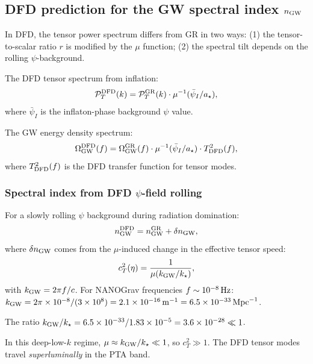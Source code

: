\documentclass[11pt]{article}
\newcommand{\ee}[1]{\times 10^{#1}}
\newcommand{\mufd}{\mu}
\newcommand{\DFD}{{\rm DFD}}
\begin{document}
\subsection{DFD prediction for the GW spectral index $n_{\rm GW}$}

In DFD, the tensor power spectrum differs from GR in two ways:
(1) the tensor-to-scalar ratio $r$ is modified by the $\mufd$ function;
(2) the spectral tilt depends on the rolling $\psi$-background.

The DFD tensor spectrum from inflation:
\begin{equation}\label{eq:tensor-spectrum}
  \mathcal{P}_T^\DFD(k) = \mathcal{P}_T^{\rm GR}(k)\cdot
  \mufd^{-1}(\bar\psi_I/a_\star),
\end{equation}
where $\bar\psi_I$ is the inflaton-phase background $\psi$ value.

The GW energy density spectrum:
\begin{equation}
  \Omega_{\rm GW}^\DFD(f) = \Omega_{\rm GW}^{\rm GR}(f)\cdot
  \mufd^{-1}(\bar\psi_I/a_\star)\cdot
  T_\DFD^2(f),
\end{equation}
where $T_\DFD^2(f)$ is the DFD transfer function for tensor modes.

\subsubsection{Spectral index from DFD $\psi$-field rolling}

For a slowly rolling $\psi$ background during radiation domination:
\begin{equation}
  n_{\rm GW}^\DFD = n_{\rm GW}^{\rm GR} + \delta n_{\rm GW},
\end{equation}
where $\delta n_{\rm GW}$ comes from the $\mufd$-induced change in
the effective tensor speed:
\begin{equation}
  c_T^2(\eta) = \frac{1}{\mufd(k_{\rm GW}/k_\star)},
\end{equation}
with $k_{\rm GW} = 2\pi f/c$.  For NANOGrav frequencies
$f \sim 10^{-8}\,{\rm Hz}$: $k_{\rm GW} = 2\pi\times 10^{-8}/(3\ee{8})
= 2.1\ee{-16}\,{\rm m}^{-1} = 6.5\ee{-33}\,{\rm Mpc}^{-1}$.

The ratio $k_{\rm GW}/k_\star = 6.5\ee{-33}/1.83\ee{-5} = 3.6\ee{-28} \ll 1$.

In this deep-low-$k$ regime, $\mufd \approx k_{\rm GW}/k_\star \ll 1$,
so $c_T^2 \gg 1$.  The DFD tensor modes travel \emph{superluminally}
in the PTA band.
\end{document}
